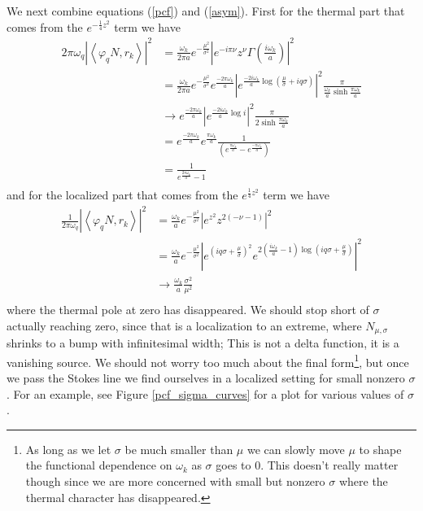 \documentclass[12pt,a4paper]{article}
\begin{document}
We next combine equations (\ref{pcf}) and (\ref{asym}).  First for the thermal part that comes from the $e^{-\frac{1}{4}z^2}$ term we have
\begin{equation}
  \begin{aligned}
    2\pi\omega_q \left|\left< \varphi_q N, r_k \right>\right|^2 &= \frac{\omega_k}{2 \pi a} e^{-\frac{\mu^2}{\sigma^2}} \left|e^{-i\pi \nu} z^\nu\Gamma\left(\frac{i\omega_k}{a}\right)\right|^2   \\
    &= \frac{\omega_k}{2 \pi a} e^{-\frac{\mu^2}{\sigma^2}}  e^{\frac{-2\pi \omega_k}{a}} \left|e^{\frac{-2i\omega_k}{a} \log{(\frac{\mu}{\sigma} + iq\sigma)}}\right|^2  \frac{\pi}{\frac{\omega_k}{a} \sinh \frac{\pi \omega_k}{a}} \\
  &\to  e^{\frac{-2\pi \omega_k}{a}} \left|e^{\frac{-2i\omega_k}{a} \log{i}}\right|^2  \frac{\pi}{2\sinh \frac{\pi \omega_k}{a}} \\
  & =  e^{\frac{-2\pi \omega_k}{a}} e^{\frac{\pi \omega_k}{a}}  \frac{1}{ \left( e^{\frac{\pi \omega_k}{a}} - e^{\frac{-\pi \omega_k}{a}} \right)} \\
  & =  \frac{1}{e^{\frac{2\pi\omega_k}{a}} - 1} \\
  \end{aligned}
\end{equation}
and for the localized part that comes from the $e^{\frac{1}{4}z^2}$ term we have
\begin{equation}
  \begin{aligned}
    \frac{1}{2\pi\omega_q} \left|\left< \varphi_q N, r_k \right>\right|^2 &= \frac{\omega_k}{a} e^{-\frac{\mu^2}{\sigma^2}} \left|e^{z^2}z ^ {2(-\nu - 1)}\right|^2 \\
    &= \frac{\omega_k}{a} e^{-\frac{\mu^2}{\sigma^2}} \left|e^{ \left(  iq\sigma + \frac{\mu}{\sigma} \right)^2 } e^{{2\left(\frac{i\omega_k}{a} - 1\right)\log{ \left(  iq\sigma + \frac{\mu}{\sigma} \right)   }   }   }\right|^2 \\
    &\to \frac{\omega_k}{a} \frac{\sigma^2}{\mu^2} \\
  \end{aligned}
\end{equation}
where the thermal pole at zero has disappeared. We should stop short of $\sigma$ actually reaching zero, since that is a localization to an extreme, where $N_{\mu,\sigma}$ shrinks to a bump with infinitesimal width; This is not a delta function, it is a vanishing source.  We should not worry too much about the final form\footnote{As long as we let $\sigma$ be much smaller than $\mu$ we can slowly move $\mu$ to shape the functional dependence on $\omega_k$ as $\sigma$ goes to 0.  This doesn't really matter though since we are more concerned with small but nonzero $\sigma$ where the thermal character has disappeared.}, but once we pass the Stokes line we find ourselves in a localized setting for small nonzero $\sigma$. For an example, see Figure \ref{pcf_sigma_curves} for a plot for various values of $\sigma$.
\end{document}

